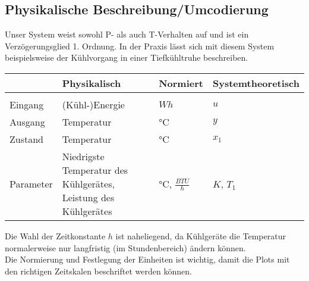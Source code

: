 \subsection{Physikalische Beschreibung/Umcodierung}
Unser System weist sowohl P- als auch T-Verhalten auf und ist ein Verzögerungsglied 1. Ordnung. In der Praxis lässt sich mit diesem System beispielsweise der Kühlvorgang in einer Tiefkühltruhe beschreiben.

\vspace*{0.5cm}
\begin{center}
  \begin{tabular}{l| |l|l|l}
    & Physikalisch & Normiert   & Systemtheoretisch \\\hline\hline
    & & & \\
    Eingang   & (Kühl-)Energie  & $Wh$ & $u$ \\
    Ausgang   & Temperatur      & °C                & $y$ \\
    Zustand   & Temperatur      & °C                & $x_{1}$ \\
    Parameter & \makecell[l]{Niedrigste Temperatur des\\ Kühlgerätes,\\Leistung des Kühlgerätes}                & °C, $\frac{BTU}{h}$    & $K$, $T_{1}$ \\
  \end{tabular}
\end{center}
\vspace*{0.5cm}
\noindent{}Die Wahl der Zeitkonstante $h$ ist naheliegend, da Kühlgeräte die Temperatur normalerweise nur langfristig (im Stundenbereich) ändern können.\\
Die Normierung und Festlegung der Einheiten ist wichtig, damit die Plots mit den richtigen Zeitskalen beschriftet werden können.





